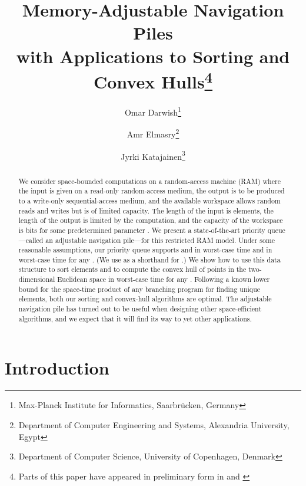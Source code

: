 \documentclass[final,onetabnum,onefignum,onethmnum]{siamltex}
\newcommand{\Minimum}{\mbox{}}
\newcommand{\Insert}{\mbox{}}
\newcommand{\Extract}{\mbox{}}
\begin{document}
\title{Memory-Adjustable Navigation Piles\\{}with Applications to
  Sorting and Convex Hulls\thanks{Parts of this paper have appeared
  in preliminary form in \cite{AEK13} and \cite{DE14}}}

\author{Omar Darwish\thanks{Max-Planck Institute for Informatics, Saarbr\"{u}cken, Germany}
\and
Amr Elmasry\thanks{Department of Computer Engineering and Systems, Alexandria University, Egypt}
\and 
Jyrki Katajainen\thanks{Department of Computer Science, University of Copenhagen, Denmark}
}
 
\maketitle
\pagestyle{plain}

\begin{abstract} 
We consider space-bounded computations on a random-access machine (RAM)
where the input is given on a read-only random-access medium, the
output is to be produced to a write-only sequential-access medium, and
the available workspace allows random reads and writes but is of
limited capacity.  The length of the input is  elements, the length
of the output is limited by the computation, and the capacity of the
workspace is  bits for some predetermined parameter .
We present a state-of-the-art priority queue---called an adjustable
navigation pile---for this restricted RAM model.  Under some
reasonable assumptions, our priority queue supports \Minimum{} and
\Insert{} in  worst-case time and \Extract{} in  worst-case time for any . (We use  as a
shorthand for .)
We show how to use this data structure to sort  elements and to
compute the convex hull of  points in the two-dimensional Euclidean
space in  worst-case time for any . 
Following a known lower bound for the space-time product of any branching program for finding unique elements, 
both our sorting and convex-hull algorithms are optimal.
The adjustable navigation pile has turned out to be useful when
designing other space-efficient algorithms, and we expect that it will find
its way to yet other applications.
\end{abstract}

\section{Introduction}
\label{sec:introduction}
\end{document}
